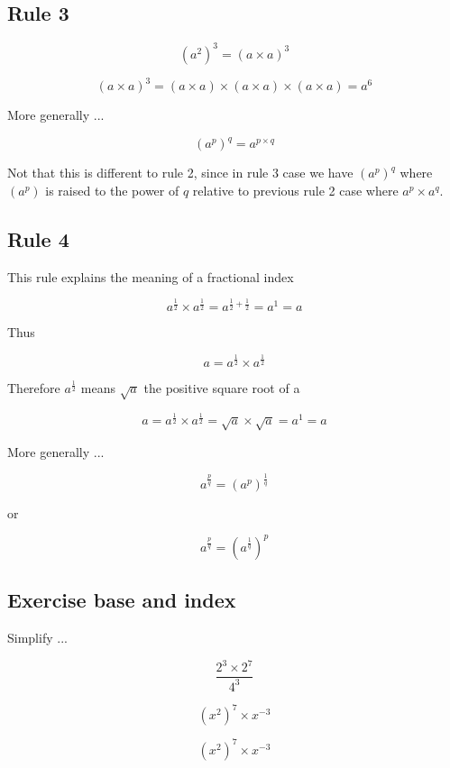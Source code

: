 \subsection{Rule 3}

\begin{equation}
 (a^{2})^{3}  = (a \times a)^{3}
\end{equation}

\begin{equation}
(a \times a)^{3} = (a \times a) \times (a \times a) \times (a \times a)= a^{6}
\end{equation}

More generally ...

\begin{equation}
(a^{p})^{q} = a^{p \times q}
\end{equation}

Not that this is different to rule 2, since in rule 3 case we have $ (a^{p})^{q} $ where $ (a^{p})$ is raised to the power of $q$ relative to previous rule 2 case where $ a^{p} \times a^{q} $.

\subsection{Rule 4}

This rule explains the meaning of a fractional index

\begin{equation}
a^{\frac{1}{2}} \times a^{\frac{1}{2}} = a^{\frac{1}{2} + \frac{1}{2}} = a^{1} = a 
\end{equation}

Thus

\begin{equation}
a = a^{\frac{1}{2}} \times a^{\frac{1}{2}}  
\end{equation}

Therefore $a^{\frac{1}{2}}$ means $\sqrt{a} $ the positive square root of a 

\begin{equation}
a = a^{\frac{1}{2}} \times a^{\frac{1}{2}}  = \sqrt{a} \times \sqrt{a} = a^{1} = a
\end{equation}

More generally ...

\begin{equation}
a^{\frac{p}{q}} = (a^{p})^{\frac{1}{q}} 
\end{equation}

or

\begin{equation}
a^{\frac{p}{q}} = (a^{\frac{1}{q}})^{p}
\end{equation}

\subsection{Exercise base and index}

Simplify ...

\begin{equation}
  \frac{2^{3} \times 2^{7}}{4^{3}}
\end{equation}

\begin{equation}
  (x^{2})^{7} \times x^{-3}
\end{equation}

\begin{equation}
  (x^{2})^{7} \times x^{-3}
\end{equation}

